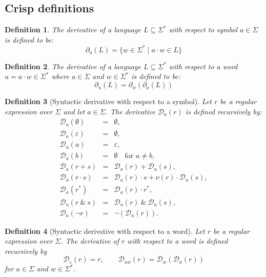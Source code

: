 \documentclass{article}
\newtheorem{definition}{Definition}[section]
\begin{document}
\subsection{Crisp definitions}\label{crisp-derivative}
\begin{definition}\label{def:derivative}
    The derivative of a language $L \subseteq \Sigma^*$ with respect to symbol $a \in \Sigma$ is defined to be:
    $$
        \partial_a(L)=\{ w \in \Sigma^* \mid a \cdot w \in L \}
    $$
\end{definition}

\begin{definition}\label{def:derivative-string}
    The derivative of a language $L \subseteq \Sigma^*$ with respect to a word $u=a\cdot w \in \Sigma^*$ where $a \in \Sigma$ and $w \in \Sigma^*$ is defined to be:
    $$
        \partial_u(L)=\partial_w(\partial_a(L))
    $$
\end{definition}

\begin{definition}[Syntactic derivative with respect to a symbol]\label{def:regex-symbol-derivative}
Let \(r\) be a regular expression over \(\Sigma\) and let \(a\in\Sigma\).
The derivative \(\mathcal D_a(r)\) is defined recursively by:
\[
\begin{array}{rcl}
    \mathcal{D}_a(\emptyset) &=& \emptyset,\\[0.5ex]
    \mathcal{D}_a(\varepsilon) &=& \emptyset,\\[0.5ex]
    \mathcal{D}_a(a) &=& \varepsilon,\\[0.5ex]
    \mathcal{D}_a(b) &=& \emptyset \quad \text{for } a\neq b,\\[0.5ex]
    \mathcal{D}_a(r+s) &=& \mathcal{D}_a(r)+\mathcal{D}_a(s),\\[0.5ex]
    \mathcal{D}_a(r\cdot s) &=& \mathcal{D}_a(r)\cdot s + \nu(r)\cdot \mathcal{D}_a(s),\\[0.5ex]
    \mathcal{D}_a(r^*) &=& \mathcal{D}_a(r)\cdot r^*,\\[0.5ex]
    \mathcal{D}_a(r\:\&\:s) &=& \mathcal{D}_a(r)\:\&\:\mathcal{D}_a(s),\\[0.5ex]
    \mathcal{D}_a(\neg r) &=& \neg(\mathcal{D}_a(r)).
\end{array}
\]
\end{definition}

\begin{definition}[Syntactic derivative with respect to a word]\label{def:regex-derivative}
Let \(r\) be a regular expression over \(\Sigma\). The derivative of \(r\) with
respect to a word is defined recursively by
\[
     \mathcal{D}_\varepsilon(r)=r,
     \qquad
     \mathcal{D}_{aw}(r)=\mathcal{D}_w(\mathcal{D}_a(r))
\]
for \(a\in\Sigma\) and \(w\in\Sigma^*\).
\end{definition}
\end{document}
